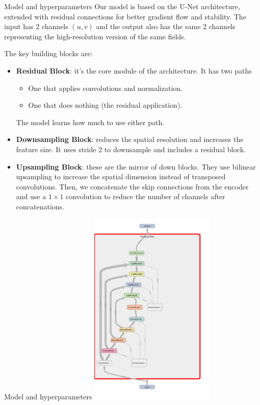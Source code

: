 \documentclass[8pt]{beamer}
\begin{document}
\begin{frame}{Model and hyperparameters}
    Our model is based on the U-Net architecture, extended with residual connections for better gradient flow and stability.
    The input has 2 channels $(u,v)$ and the output also has the same 2 channels representing the high-resolution version of the same fields.

    The key building blocks are:
    \begin{itemize}
        \item \textbf{Residual Block}: it's the core module of the architecture. It has two paths
        \begin{itemize}
            \item One that applies convolutions and normalization.
            \item One that does nothing (the residual application).
        \end{itemize}
        The model learns how much to use either path.
        \item \textbf{Downsampling Block}: reduces the spatial resolution and increases the feature size. It uses stride 2 to downsample and includes a residual block.
        \item \textbf{Upsampling Block}: these are the mirror of down blocks. They use bilinear upsampling to increase the spatial dimension instead of transposed convolutions. Then, we concatenate  the skip connections from the encoder and use a $1\times 1$ convolution to reduce the number of channels after concatenations.
    \end{itemize}
    \end{frame}

    \begin{frame}{Model and hyperparameters}
    \centering
    \includegraphics[width=0.45\textwidth]{images/unet_experiment_graph.png}
\end{frame}
\end{document}

